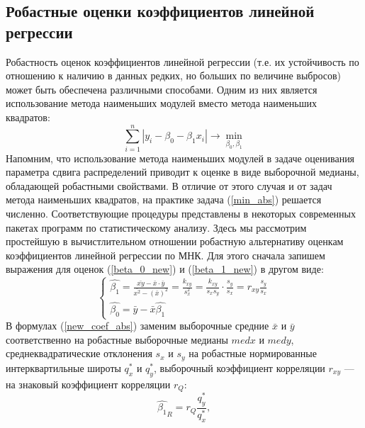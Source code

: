 \documentclass[a4paper]{article}
\begin{document}
    \subsection{Робастные оценки коэффициентов линейной регрессии}
    \noindent Робастность оценок коэффициентов линейной регрессии (т.е. их устойчивость по отношению к наличию в данных редких, но больших по величине выбросов) может быть обеспечена различными способами. Одним из них является использование метода наименьших модулей вместо метода наименьших квадратов:
    \begin{equation}
	    \sum_{i=1}^{n}{|y_{i} - \beta_{0} - \beta_{1}x_{i}|}\rightarrow \min_{\beta_{0}, \beta_{1}}
	    \label{min_abs}
	\end{equation}
    Напомним, что использование метода наименьших модулей в задаче оценивания параметра сдвига распределений приводит к оценке в виде выборочной медианы, обладающей робастными свойствами. В отличие от этого случая и от задач метода наименьших квадратов, на практике задача (\ref{min_abs}) решается численно. Соответствующие процедуры представлены в некоторых современных пакетах программ по статистическому анализу.
    \newline
    Здесь мы рассмотрим простейшую в вычистлительном отношении робастную альтернативу оценкам коэффициентов линейной регрессии по МНК. Для этого сначала запишем выражения для оценок (\ref{beta_0_new}) и (\ref{beta_1_new}) в другом виде:
    \begin{equation}
    	\begin{cases}
        \hat{\beta_{1}} = \frac{\bar{xy} - \bar{x} \cdot \bar{y}}{\bar{x^{2}} - (\bar{x})^{2}} = \frac{k_{xy}}{s_{x}^{2}} = \frac{k_{xy}}{s_{x}s_{y}} \cdot \frac{s_{y}}{s_{x}} = r_{xy}\frac{s_{y}}{s_{x}} \\         
        \hat{\beta_{0}} = \bar{y} - \bar{x}\hat{\beta_{1}}
        \end{cases}
        \label{new_coef_abs}
    \end{equation}
    В формулах (\ref{new_coef_abs}) заменим выборочные средние $\bar{x}$ и $\bar{y}$ соответственно на робастные выборочные медианы $med x$ и $med y$, среднеквадратические отклонения $s_{x}$ и $s_{y}$ на робастные нормированные интерквартильные широты $q^{*}_{x}$ и $q^{*}_{y}$, выборочный коэффициент корреляции $r_{xy}$ — на знаковый коэффициент корреляции $r_{Q}$: 
    \begin{equation}
        \hat{\beta_{1}}_{R} = r_{Q}\frac{q^{*}_{y}}{q^{*}_{x}},
        \label{b_1R}
    \end{equation}
\end{document}

